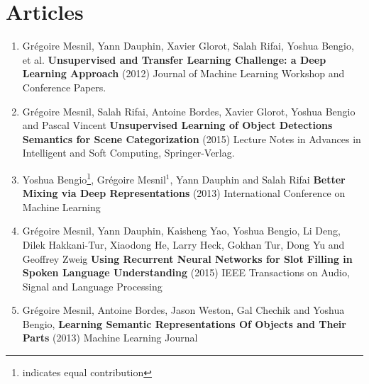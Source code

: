 \chapter*{Articles}

\begin{enumerate}

\item Grégoire Mesnil, Yann Dauphin, Xavier Glorot, Salah Rifai, Yoshua Bengio,
et al. {\bf Unsupervised and Transfer Learning Challenge: a Deep Learning
Approach} (2012) Journal of Machine Learning Workshop and Conference Papers.

\item Grégoire Mesnil, Salah Rifai, Antoine Bordes, Xavier Glorot, Yoshua Bengio and Pascal Vincent
{\bf Unsupervised Learning of Object Detections Semantics for Scene Categorization}
(2015) Lecture Notes in Advances in Intelligent and Soft Computing, Springer-Verlag.

\item Yoshua Bengio\footnote{indicates equal contribution}, Grégoire Mesnil$^{1}$, Yann Dauphin and Salah Rifai
{\bf Better Mixing via Deep Representations} (2013) International
Conference on Machine Learning

\item Grégoire Mesnil, Yann Dauphin, Kaisheng Yao, Yoshua Bengio, Li Deng, Dilek Hakkani-Tur, Xiaodong He, Larry Heck, Gokhan Tur, Dong Yu and Geoffrey Zweig {\bf Using Recurrent Neural Networks for Slot Filling in Spoken Language Understanding} (2015) IEEE Transactions on Audio, Signal and Language Processing

\item Grégoire Mesnil, Antoine Bordes, Jason Weston,
Gal Chechik and Yoshua Bengio, {\bf Learning Semantic Representations Of
Objects and Their Parts} (2013) Machine Learning Journal

\end{enumerate}
